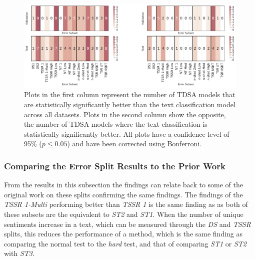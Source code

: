 \begin{figure}[ht!]
    \centering
    \includegraphics[scale=0.5]{images/augmentation/methods_performance/baseline/baseline_combined_dataset_error_subset_heatmap.pdf}
    \caption{Plots in the first column represent the number of TDSA models that are statistically significantly better than the text classification model across all datasets. Plots in the second column show the opposite, the number of TDSA models where the text classification is statistically significantly better. All plots have a confidence level of 95\% ($p \leq 0.05$) and have been corrected using Bonferroni.}
    \label{fig:aug_baseline_combined_dataset_error_subset_heatmap}
\end{figure}


\afterpage{
    \begin{landscape}%
            \centering
            
    \end{landscape}
}

\newpage
\FloatBarrier
\subsubsection{Comparing the Error Split Results to the Prior Work}
\label{section:augmentation_cwr_comparing_to_prior_work_new}
From the results in this subsection the findings can relate back to some of the original work on these splits confirming the same findings. The findings of the \textit{TSSR 1-Multi} performing better than \textit{TSSR 1} is the same finding as \citet{nguyen-shirai-2015-phrasernn} as both of these subsets are the equivalent to \textit{ST2} and \textit{ST1}. When the number of unique sentiments increase in a text, which can be measured through the \textit{DS} and \textit{TSSR} splits, this reduces the performance of a method, which is the same finding as \citet{xue-li-2018-aspect} comparing the normal test to the \textit{hard} test, and that of \citet{nguyen-shirai-2015-phrasernn} comparing \textit{ST1} or \textit{ST2} with \textit{ST3}.  

